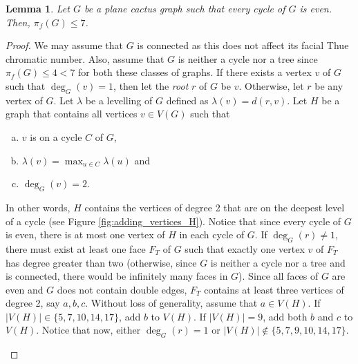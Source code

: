\documentclass{patmorin}
\newcommand{\dist}{{d}}
\newtheorem{lemma}[theorem]{Lemma}
\begin{document}
\begin{lemma}
 Let $G$ be a plane cactus graph such that every cycle of $G$ is even. Then, $\pi_f(G) \leq 7$.
 \label{lem:outer_face_cactus}
\end{lemma}

\begin{proof}
 We may assume that $G$ is connected as this does not affect its facial Thue chromatic number. Also, assume that $G$ is neither a cycle nor a tree since $\pi_f(G) \leq 4 < 7$ for both these classes of graphs.  
 If there exists a vertex $v$ of $G$ such that $\deg_G(v)=1$, then let the \emph{root} $r$ of $G$ be $v$. Otherwise, let $r$ be any vertex of $G$. Let $\lambda$ be a levelling of $G$ defined as $\lambda(v) = \dist(r,v)$. Let $H$ be a graph that contains all vertices $v\in V(G)$ such that
 \begin{enumerate}[a)]
  \item $v$ is on a cycle $C$ of $G$,
  \item $\lambda(v)=\max_{u \in C} \lambda(u)$ and
  \item $\deg_G(v)=2$.
 \end{enumerate} 
 In other words, $H$ contains the vertices of degree 2 that are on the deepest level of a cycle (see Figure \ref{fig:adding_vertices_H}). Notice that since every cycle of $G$ is even, there is at most one vertex of $H$ in each cycle of $G$. If $\deg_G(r)\not=1$, there must exist at least one face $F_T$ of $G$ such that exactly one vertex $v$ of $F_T$ has degree greater than two (otherwise, since $G$ is neither a cycle nor a tree and is connected, there would be infinitely many faces in $G$). Since all faces of $G$ are even and $G$ does not contain double edges, $F_T$ contains at least three vertices of degree 2, say $a,b,c$. Without loss of generality, assume that $a \in V(H)$. If $|V(H)|\in \{5,7,10,14,17\}$, add $b$ to $V(H)$. If $|V(H)|=9$, add both $b$ and $c$ to $V(H)$. Notice that now, either $\deg_G(r)=1$ or $|V(H)|\notin \{5,7,9,10,14,17\}$.
 
 \begin{figure}  
  \centering
  
  \begin{subfigure}[t]{0.45\textwidth}
    \centering
\end{subfigure}
\end{figure}
\end{proof}
\end{document}
